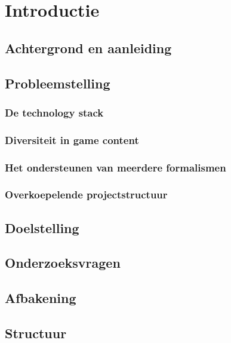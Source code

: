 \chapter{Introductie}
\label{ch:introdcution}

\section{Achtergrond en aanleiding}


\section{Probleemstelling}


\subsection{De technology stack}


\subsection{Diversiteit in game content}


\subsection{Het ondersteunen van meerdere formalismen}


\subsection{Overkoepelende projectstructuur}


\section{Doelstelling}


\section{Onderzoeksvragen}


\section{Afbakening}


\section{Structuur}